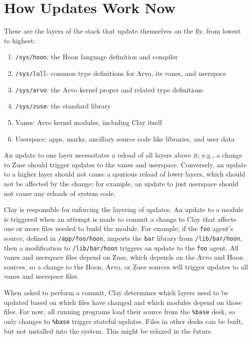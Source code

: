 \documentclass[twoside]{article}
\begin{document}
\section{How Updates Work Now}

These are the layers of the stack that update themselves on the fly, from lowest to highest:

\begin{enumerate}
  \item  \texttt{/sys/hoon}: the Hoon language definition and compiler
  \item  \texttt{/sys/lull}: common type definitions for Arvo, its vanes, and userspace
  \item  \texttt{/sys/arvo}: the Arvo kernel proper and related type definitions
  \item  \texttt{/sys/zuse}: the standard library
  \item  Vanes: Arvo kernel modules, including Clay itself
  \item  Userspace:  apps, marks, ancillary source code like libraries, and user data
\end{enumerate}

An update to one layer necessitates a reload of all layers above it; e.g., a change to Zuse should trigger updates to the vanes and userspace. Conversely, an update to a higher layer should not cause a spurious reload of lower layers, which should not be affected by the change; for example, an update to just userspace should not cause any reloads of system code.

Clay is responsible for enforcing the layering of updates. An update to a module is triggered when an attempt is made to commit a change to Clay that affects one or more files needed to build the module. For example, if the \lstinline[style=inlinecode]{foo} agent's source, defined in \lstinline[style=inlinecode]{/app/foo/hoon}, imports the \lstinline[style=inlinecode]{bar} library from \lstinline[style=inlinecode]{/lib/bar/hoon}, then a modification to \lstinline[style=inlinecode]{/lib/bar/hoon} triggers an update to the \lstinline[style=inlinecode]{foo} agent. All vanes and userspace files depend on Zuse, which depends on the Arvo and Hoon sources, so a change to the Hoon, Arvo, or Zuse sources will trigger updates to all vanes and userspace files.

When asked to perform a commit, Clay determines which layers need to be updated based on which files have changed and which modules depend on those files. For now, all running programs load their source from the \lstinline[style=inlinecode]{%base} desk, so only changes to \lstinline[style=inlinecode]{%base} trigger stateful updates. Files in other desks can be built, but not installed into the system. This might be relaxed in the future.
\end{document}
